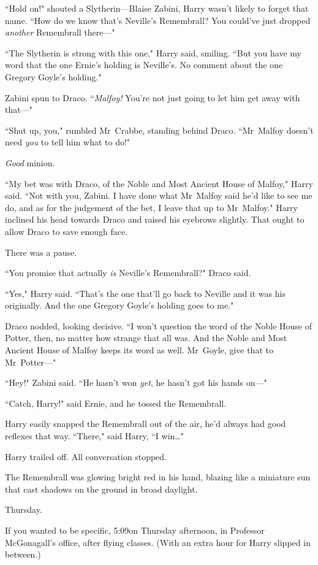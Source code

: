 ``Hold on!" shouted a Slytherin—Blaise Zabini, Harry wasn't likely to forget that name. ``How do we know that's Neville's Remembrall? You could've just dropped \emph{another} Remembrall there—"

``The Slytherin is strong with this one," Harry said, smiling. ``But you have my word that the one Ernie's holding is Neville's. No comment about the one Gregory Goyle's holding."

Zabini spun to Draco. ``\emph{Malfoy!} You're not just going to let him get away with that—"

``Shut up, you," rumbled Mr~Crabbe, standing behind Draco. ``Mr~Malfoy doesn't need \emph{you} to tell him what to do!"

\emph{Good} minion.

``My bet was with Draco, of the Noble and Most Ancient House of Malfoy," Harry said. ``Not with you, Zabini. I have done what Mr~Malfoy said he'd like to see me do, and as for the judgement of the bet, I leave that up to Mr~Malfoy." Harry inclined his head towards Draco and raised his eyebrows slightly. That ought to allow Draco to save enough face.

There was a pause.

``You promise that actually \emph{is} Neville's Remembrall?" Draco said.

``Yes," Harry said. ``That's the one that'll go back to Neville and it was his originally. And the one Gregory Goyle's holding goes to me."

Draco nodded, looking decisive. ``I won't question the word of the Noble House of Potter, then, no matter how strange that all was. And the Noble and Most Ancient House of Malfoy keeps its word as well. Mr~Goyle, give that to Mr~Potter—"

``Hey!" Zabini said. ``He hasn't won \emph{yet}, he hasn't got his hands on—"

``Catch, Harry!" said Ernie, and he tossed the Remembrall.

Harry easily snapped the Remembrall out of the air, he'd always had good reflexes that way. ``There," said Harry, ``I win{\ldots}"

Harry trailed off. All conversation stopped.

The Remembrall was glowing bright red in his hand, blazing like a miniature sun that cast shadows on the ground in broad daylight.

\later

Thursday.

If you wanted to be specific, 5:09\pm on Thursday afternoon, in Professor McGonagall's office, after flying classes. (With an extra hour for Harry slipped in between.)

